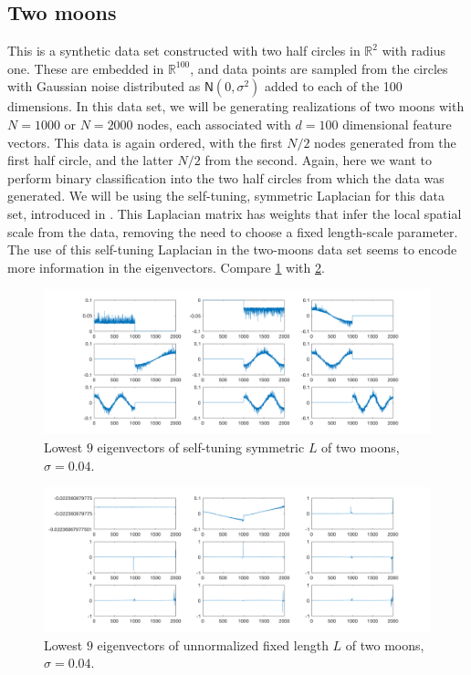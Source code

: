 \documentclass{siamart1116}
\begin{document}
\subsection{Two moons}
This is a synthetic data set constructed with two half circles in $\mathbb{R}^2$ with radius one. These are embedded in $\mathbb{R}^{100}$, and data points are sampled from the circles with Gaussian noise distributed as $\mathsf{N}(0,\sigma^2)$ added to each of the 100 dimensions. In this data set, we will be generating realizations of two moons with $N=1000$ or $N=2000$ nodes, each associated with $d=100$ dimensional feature vectors. This data is again ordered, with the first $N/2$ nodes generated from the first half circle, and the latter $N/2$ from the second. Again, here we want to perform binary classification into the two half circles from which the data was generated. We will be using the self-tuning, symmetric Laplacian for this data set, introduced in \cite{SelfTuning}. This Laplacian matrix has weights that infer the local spatial scale from the data, removing the need to choose a fixed length-scale parameter. The use of this self-tuning Laplacian in the two-moons data set seems to encode more information in the eigenvectors. Compare \cref{fig:moon_spec} with \cref{fig:moon_un_spec}.

\begin{figure}[!htb]
\caption{\label{fig:moon_spec} Lowest $9$ eigenvectors of self-tuning symmetric $L$ of two moons, $\sigma = 0.04$.}
\includegraphics[width=\linewidth]{laplacians/moon_laplacian.png}
\end{figure}

\begin{figure}[!htb]
\caption{\label{fig:moon_un_spec} Lowest $9$ eigenvectors of unnormalized fixed length $L$ of two moons, $\sigma = 0.04$.}
\includegraphics[width=\linewidth]{laplacians/moon_laplacian_un.png}
\end{figure}
\end{document}
